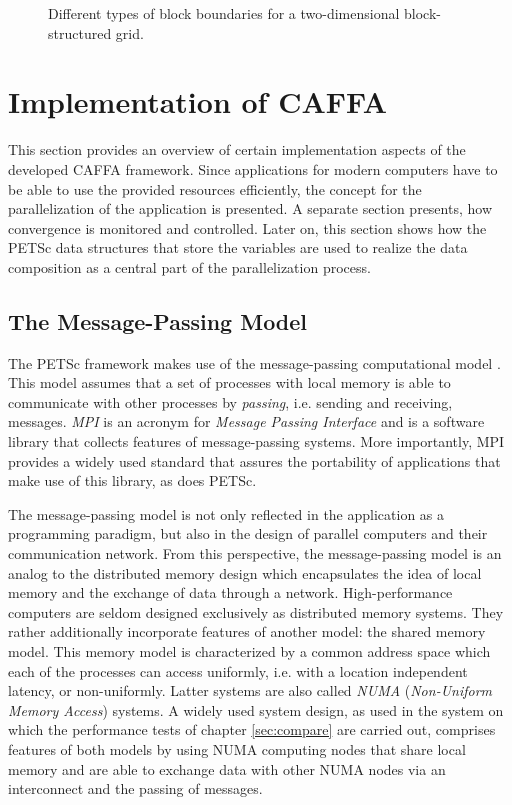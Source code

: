 \begin{figure}[h!]
  \centering
  
  \caption{Different types of block boundaries for a two-dimensional block-structured grid.}
  \label{fig:matching}
\end{figure}

\section{Implementation of CAFFA}
\label{sec:caffaimpl}

This section provides an overview of certain implementation aspects of the developed CAFFA framework. Since applications for modern computers have to be able to use the provided resources efficiently, the concept for the parallelization of the application is presented. A separate section presents, how convergence is monitored and controlled. Later on, this section shows how the PETSc data structures that store the variables are used to realize the data composition as a central part of the parallelization process.

\subsection{The Message-Passing Model}

The PETSc framework makes use of the message-passing computational model \cite{gropp99}. This model assumes that a set of processes with local memory is able to communicate with other processes by \emph{passing}, i.e. sending and receiving, messages. \emph{MPI} is an acronym for \emph{Message Passing Interface} and is a software library that collects features of message-passing systems. More importantly, MPI provides a widely used standard that assures the portability of applications that make use of this library, as does PETSc. 

The message-passing model is not only reflected in the application as a programming paradigm, but also in the design of parallel computers and their communication network. From this perspective, the message-passing model is an analog to the distributed memory design which encapsulates the idea of local memory and the exchange of data through a network. High-performance computers are seldom designed exclusively as distributed memory systems. They rather additionally incorporate features of another model: the shared memory model. This memory model is characterized by a common address space which each of the processes can access uniformly, i.e. with a location independent latency, or non-uniformly. Latter systems are also called \emph{NUMA} (\emph{Non-Uniform Memory Access}) systems. A widely used system design, as used in the system on which the performance tests of chapter \ref{sec:compare} are carried out, comprises features of both models by using NUMA computing nodes that share local memory and are able to exchange data with other NUMA nodes via an interconnect and the passing of messages.

